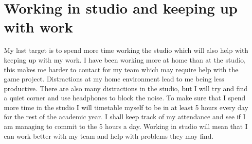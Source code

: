 \documentclass{scrartcl}
\begin{document}
\section{Working in studio and keeping up with work}
My last target is to spend more time working the studio which will also help with keeping up with my work. I have been working more at home than at the studio, this makes me harder to contact for my team which may require help with the game project. Distractions at my home environment lead to me being less productive. There are also many distractions in the studio, but I will try and find a quiet corner and use headphones to block the noise.
\newline
\newline
To make sure that I spend more time in the studio I will timetable myself to be in at least 5 hours every day for the rest of the academic year. I shall keep track of my attendance and see if I am managing to commit to the 5 hours a day.
\newline
\newline
Working in studio will mean that I can work better with my team and help with problems they may find.



\end{document}
